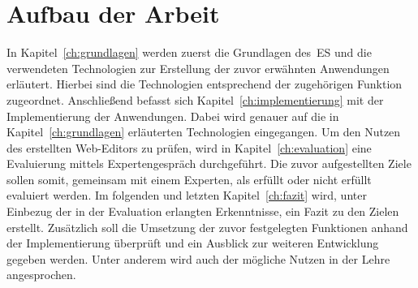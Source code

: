 \section{Aufbau der Arbeit}\label{sec:aufbau-der-arbeit}
In Kapitel~\ref{ch:grundlagen} werden zuerst die Grundlagen des~\ac{ES} und die verwendeten Technologien
zur Erstellung der zuvor erwähnten Anwendungen erläutert.
Hierbei sind die Technologien entsprechend der zugehörigen Funktion zugeordnet.
Anschließend befasst sich Kapitel~\ref{ch:implementierung} mit der Implementierung der Anwendungen.
Dabei wird genauer auf die in Kapitel~\ref{ch:grundlagen} erläuterten Technologien eingegangen.
Um den Nutzen des erstellten Web-Editors zu prüfen, wird in Kapitel~\ref{ch:evaluation} eine Evaluierung mittels Expertengespräch durchgeführt.
Die zuvor aufgestellten Ziele sollen somit, gemeinsam mit einem Experten, als erfüllt oder nicht erfüllt evaluiert werden.
Im folgenden und letzten Kapitel~\ref{ch:fazit} wird, unter Einbezug der in der Evaluation erlangten Erkenntnisse, ein Fazit zu den Zielen erstellt.
Zusätzlich soll die Umsetzung der zuvor festgelegten Funktionen anhand der Implementierung überprüft und ein Ausblick zur weiteren Entwicklung gegeben werden.
Unter anderem wird auch der mögliche Nutzen in der Lehre angesprochen.
